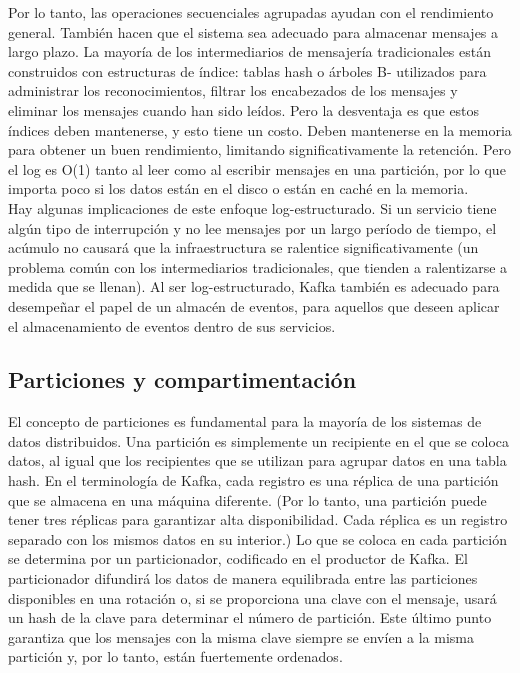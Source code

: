 \documentclass{article}
\begin{document}
Por lo tanto, las operaciones secuenciales agrupadas ayudan con el rendimiento general. También hacen que el sistema sea adecuado para almacenar mensajes a largo plazo. La mayoría de los intermediarios de mensajería tradicionales están construidos con estructuras de índice: tablas hash o árboles B- utilizados para administrar los reconocimientos, filtrar los encabezados de los mensajes y eliminar los mensajes cuando han sido leídos. Pero la desventaja es que estos índices deben mantenerse, y esto tiene un costo. Deben mantenerse en la memoria para obtener un buen rendimiento, limitando significativamente la retención. Pero el log es O(1) tanto al leer como al escribir mensajes en una partición, por lo que importa poco si los datos están en el disco o están en caché en la memoria.\\

Hay algunas implicaciones de este enfoque log-estructurado. Si un servicio tiene algún tipo de interrupción y no lee mensajes por un largo período de tiempo, el acúmulo no causará que la infraestructura se ralentice significativamente (un problema común con los intermediarios tradicionales, que tienden a ralentizarse a medida que se llenan). Al ser log-estructurado, Kafka también es adecuado para desempeñar el papel de un almacén de eventos, para aquellos que deseen aplicar el almacenamiento de eventos dentro de sus servicios.

\subsection{Particiones y compartimentación}
El concepto de particiones es fundamental para la mayoría de los sistemas de datos distribuidos. Una partición es simplemente un recipiente en el que se coloca datos, al igual que los recipientes que se utilizan para agrupar datos en una tabla hash. En el terminología de Kafka, cada registro es una réplica de una partición que se almacena en una máquina diferente. (Por lo tanto, una partición puede tener tres réplicas para garantizar alta disponibilidad. Cada réplica es un registro separado con los mismos datos en su interior.) Lo que se coloca en cada partición se determina por un particionador, codificado en el productor de Kafka. El particionador difundirá los datos de manera equilibrada entre las particiones disponibles en una rotación o, si se proporciona una clave con el mensaje, usará un hash de la clave para determinar el número de partición. Este último punto garantiza que los mensajes con la misma clave siempre se envíen a la misma partición y, por lo tanto, están fuertemente ordenados.
\end{document}
